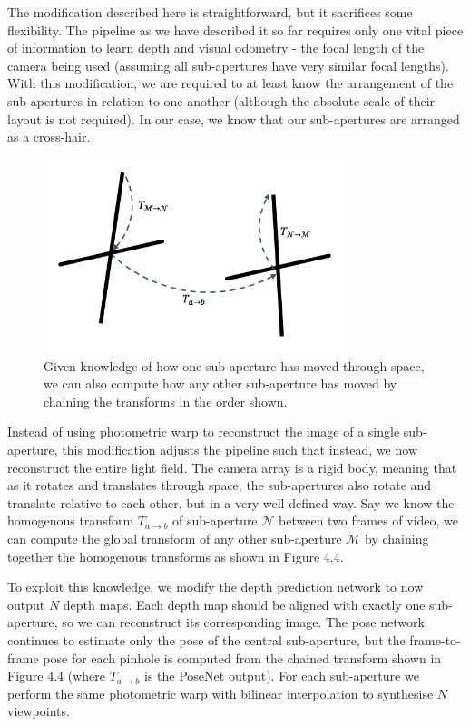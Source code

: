 The modification described here is straightforward, but it sacrifices some flexibility. The pipeline as we have described it so far requires only one vital piece of information to learn depth and visual odometry - the focal length of the camera being used (assuming all sub-apertures have very similar focal lengths). With this modification, we are required to at least know the arrangement of the sub-apertures in relation to one-another (although the absolute scale of their layout is not required). In our case, we know that our sub-apertures are arranged as a cross-hair. 

\begin{figure}[htbp]
    \centering 
    \includegraphics[width=3.5in]{images/relative_subapertures.png}
    \caption{Given knowledge of how one sub-aperture has moved through space, we can also compute how any other sub-aperture has moved by chaining the transforms in the order shown.}
\end{figure}

Instead of using photometric warp to reconstruct the image of a single sub-aperture, this modification adjusts the pipeline such that instead, we now reconstruct the entire light field. The camera array is a rigid body, meaning that as it rotates and translates through space, the sub-apertures also rotate and translate relative to each other, but in a very well defined way. Say we know the homogenous transform  $T_{a \rightarrow b}$ of sub-aperture $\mathcal{N}$ between two frames of video, we can compute the global transform of any other sub-aperture $\mathcal{M}$ by chaining together the homogenous transforms as shown in Figure 4.4.

To exploit this knowledge, we modify the depth prediction network to now output $N$ depth maps. Each depth map should be aligned with exactly one sub-aperture, so we can reconstruct its corresponding image. The pose network continues to estimate only the pose of the central sub-aperture, but the frame-to-frame pose for each pinhole is computed from the chained transform shown in Figure 4.4 (where $T_{a\rightarrow b}$ is the PoseNet output). For each sub-aperture we perform the same photometric warp with bilinear interpolation to synthesise $N$ viewpoints.

